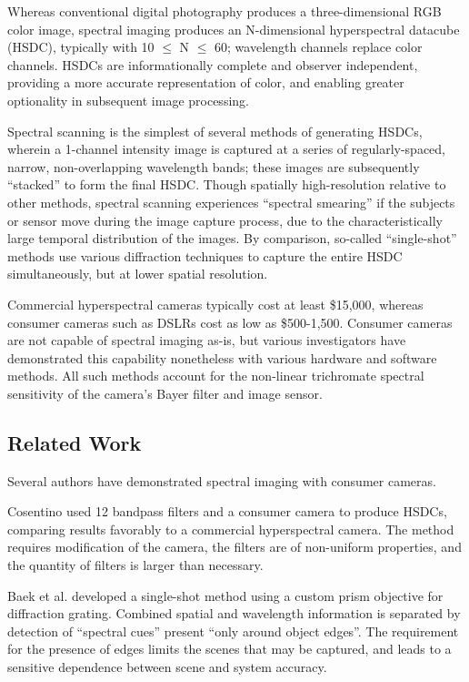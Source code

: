 \documentclass[twocolumn,10pt]{asme2ej}
\newcommand{\id}{\hspace{6 mm}}
\begin{document}

\id Whereas conventional digital photography produces a three-dimensional RGB color image, spectral imaging produces an N-dimensional hyperspectral datacube (HSDC), typically with 10 $\leq$ N $\leq$ 60; wavelength channels replace color channels. HSDCs are informationally complete and observer independent, providing a more accurate representation of color, and enabling greater optionality in subsequent image processing.


\id Spectral scanning is the simplest of several methods of generating HSDCs, wherein a 1-channel intensity image is captured at a series of regularly-spaced, narrow, non-overlapping wavelength bands; these images are subsequently ``stacked'' to form the final HSDC. Though spatially high-resolution relative to other methods, spectral scanning experiences ``spectral smearing'' if the subjects or sensor move during the image capture process, due to the characteristically large temporal distribution of the images. By comparison, so-called ``single-shot'' methods use various diffraction techniques to capture the entire HSDC simultaneously, but at lower spatial resolution.


\id Commercial hyperspectral cameras typically cost at least \$15,000, whereas consumer cameras such as DSLRs cost as low as \$500-1,500. Consumer cameras are not capable of spectral imaging as-is, but various investigators have demonstrated this capability nonetheless with various hardware and software methods. All such methods account for the non-linear trichromate spectral sensitivity of the camera's Bayer filter and image sensor.

\subsection{Related Work}

Several authors have demonstrated spectral imaging with consumer cameras.

\id Cosentino \cite{Cosentino} used 12 bandpass filters and a consumer camera to produce HSDCs, comparing results favorably to a commercial hyperspectral camera. The method requires modification of the camera, the filters are of non-uniform properties, and the quantity of filters is larger than necessary.

\id Baek et al. \cite{Baek} developed a single-shot method using a custom prism objective for diffraction grating. Combined spatial and wavelength information is separated by detection of ``spectral cues'' present ``only around object edges''. The requirement for the presence of edges limits the scenes that may be captured, and leads to a sensitive dependence between scene and system accuracy.
\end{document}
